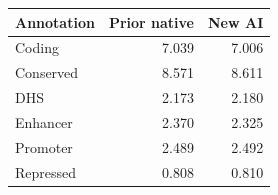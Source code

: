 \begin{tabular}{lrr}
\toprule
Annotation & Prior native & New AI \\
\midrule
Coding & 7.039 & 7.006 \\
Conserved & 8.571 & 8.611 \\
DHS & 2.173 & 2.180 \\
Enhancer & 2.370 & 2.325 \\
Promoter & 2.489 & 2.492 \\
Repressed & 0.808 & 0.810 \\
\bottomrule
\end{tabular}
